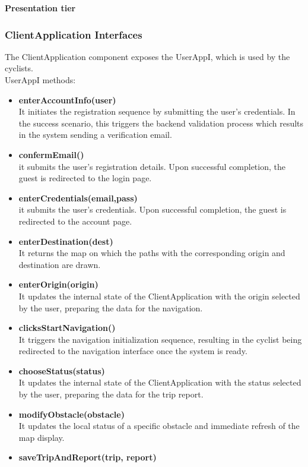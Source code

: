 \newpage
\vspace{5mm}
\noindent
\textbf{Presentation tier}\\
\subsubsection{ClientApplication Interfaces}
The ClientApplication component exposes the UserAppI, which is used by the cyclists.\\
UserAppI methods:
\begin{itemize}
    \item \textbf{enterAccountInfo(user)}\\
    It initiates the registration sequence by submitting the user's credentials. In the success scenario, this triggers the backend validation process which results in the system sending a verification email.
    \item \textbf{confermEmail()}\\
    it submits the user's registration details. Upon successful completion, the guest is redirected to the login page.
    \item \textbf{enterCredentials(email,pass)}\\
    it submits the user's credentials. Upon successful completion, the guest is redirected to the account page.
    \item \textbf{enterDestination(dest)}\\
    It returns the map on which the paths with the corresponding origin and destination are drawn.
    \item \textbf{enterOrigin(origin)}\\
    It updates the internal state of the ClientApplication with the origin selected by the user, preparing the data for the navigation.
    \item \textbf{clicksStartNavigation()}\\
    It triggers the navigation initialization sequence, resulting in the cyclist being redirected to the navigation interface once the system is ready. 
    \item \textbf{chooseStatus(status)}\\
    It updates the internal state of the ClientApplication with the status selected by the user, preparing the data for the trip report.
    \item \textbf{modifyObstacle(obstacle)}\\
    It updates the local status of a specific obstacle and immediate refresh of the map display.
    \item \textbf{saveTripAndReport(trip, report)}\\

\end{itemize}
